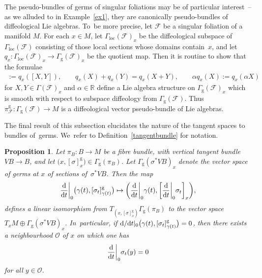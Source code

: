 \documentclass[pdftex]{sigma}
\numberwithin{equation}{section}
\newtheorem{Proposition}[Theorem]{Proposition}
\def\loc{\operatorname{loc}}
\def\g{\operatorname{g}}
\def\FF{{\mathcal{F}}}
\def\OO{{\mathcal{O}}}
\def\RB{{\mathbb{R}}}
\begin{document}
\begin{Remark}
The pseudo-bundles of germs of singular foliations may be of particular interest~-- as we alluded to in Example~\ref{ex1}, they are canonically pseudo-bundles of diffeological Lie algebras. To~be more precise, let $\FF$ be a singular foliation of a manifold $M$. For each $x\in M$, let $\Gamma_{\loc}(\FF)_{x}$ be the diffeological subspace of $\Gamma_{\loc}(\FF)$ consisting of those local sections whose domains con\-tain~$x$, and let $q_{x}\colon \Gamma_{\loc}(\FF)_{x}\rightarrow\Gamma_{\g}(\FF)_{x}$ be the quotient map. Then it is routine to show that the formulae
\begin{gather*}
[q_{x}(X),q_{x}(Y)]:=q_{x}([X,Y]),\qquad
q_{x}(X)+q_{x}(Y) =q_{x}(X+Y),\qquad
\alpha q_{x}(X):=q_{x}(\alpha X)
\end{gather*}
for $X,Y\in\Gamma(\FF)_{x}$ and $\alpha\in\RB$ define a Lie algebra structure on $\Gamma_{\g}(\FF)_{x}$ which is smooth with respect to subspace diffeology from $\Gamma_{\g}(\FF)$. Thus $\pi_{\FF}^{\g}\colon \Gamma_{\g}(\FF)\rightarrow M$ is a diffeological vector pseudo-bundle of Lie algebras.
\end{Remark}

The final result of this subsection elucidates the nature of the tangent spaces to bundles of~germs. We~refer to Definition~\ref{tangentbundle} for notation.

\begin{Proposition}\label{tangentgerm}
Let $\pi_{B}\colon B\rightarrow M$ be a fibre bundle, with vertical tangent bundle $VB\rightarrow B$, and let $\big(x,[\sigma]^{\g}_{x}\big)\in\Gamma_{\g}(\pi_{B})$. Let $\Gamma_{\g}(\sigma^{*}VB)_{x}$ denote the vector space of germs at $x$ of sections of~$\sigma^{*}VB$. Then the map
\begin{gather}\label{tangerm}
\frac{\rm d}{{\rm d}t}\bigg|_{0}\big(\gamma(t),[\sigma_{t}]^{\g}_{\gamma(t)}\big) \mapsto \bigg(\frac{\rm d}{{\rm d}t}\bigg|_{0}\gamma(t),\bigg[\frac{\rm d}{{\rm d}t}\bigg|_{0}\sigma_{t}\bigg]_{x}\bigg),
\end{gather}
defines a linear isomorphism from $T_{\left(x,[\sigma]^{\g}_{x}\right)}\Gamma_{\g}(\pi_{B})$ to the vector space $T_{x}M\oplus\Gamma_{\g}(\sigma^{*}VB)_{x}$. In~particular, if ${\rm d}/{\rm d}t|_{0}\big(\gamma(t),[\sigma_{t}]^{\g}_{\gamma(t)}\big) = 0$, then there exists a neighbourhood $\OO$ of $x$ on which one has
\begin{gather*}
\frac{\rm d}{{\rm d}t}\bigg|_{0}\sigma_{t}(y) = 0
\end{gather*}
for all $y\in\OO$.
\end{Proposition}
\end{document}
